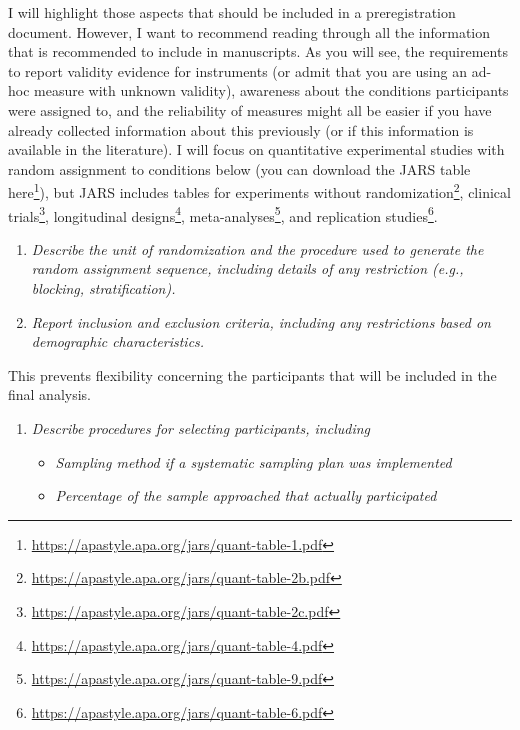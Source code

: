 \documentclass[
  oneside]{krantz}
\providecommand{\tightlist}{%
  \setlength{\itemsep}{0pt}\setlength{\parskip}{0pt}}
\renewcommand{\href}[2]{#2\footnote{\url{#1}}}
\begin{document}
I will highlight those aspects that should be included in a preregistration document. However, I want to recommend reading through all the information that is recommended to include in manuscripts. As you will see, the requirements to report validity evidence for instruments (or admit that you are using an ad-hoc measure with unknown validity), awareness about the conditions participants were assigned to, and the reliability of measures might all be easier if you have already collected information about this previously (or if this information is available in the literature). I will focus on quantitative experimental studies with random assignment to conditions below (you can download the JARS table \href{https://apastyle.apa.org/jars/quant-table-1.pdf}{here}), but JARS includes tables for \href{https://apastyle.apa.org/jars/quant-table-2b.pdf}{experiments without randomization}, \href{https://apastyle.apa.org/jars/quant-table-2c.pdf}{clinical trials}, \href{https://apastyle.apa.org/jars/quant-table-4.pdf}{longitudinal designs}, \href{https://apastyle.apa.org/jars/quant-table-9.pdf}{meta-analyses}, and \href{https://apastyle.apa.org/jars/quant-table-6.pdf}{replication studies}.

\begin{enumerate}
\def\labelenumi{\arabic{enumi}.}
\item
  \emph{Describe the unit of randomization and the procedure used to generate the random assignment sequence, including details of any restriction (e.g., blocking, stratification).}
\item
  \emph{Report inclusion and exclusion criteria, including any restrictions based on demographic characteristics.}
\end{enumerate}

This prevents flexibility concerning the participants that will be included in the final analysis.

\begin{enumerate}
\def\labelenumi{\arabic{enumi}.}
\setcounter{enumi}{2}
\tightlist
\item
  \emph{Describe procedures for selecting participants, including}

  \begin{itemize}
  \tightlist
  \item
    \emph{Sampling method if a systematic sampling plan was implemented}
  \item
    \emph{Percentage of the sample approached that actually participated}
  \end{itemize}
\end{enumerate}
\end{document}
